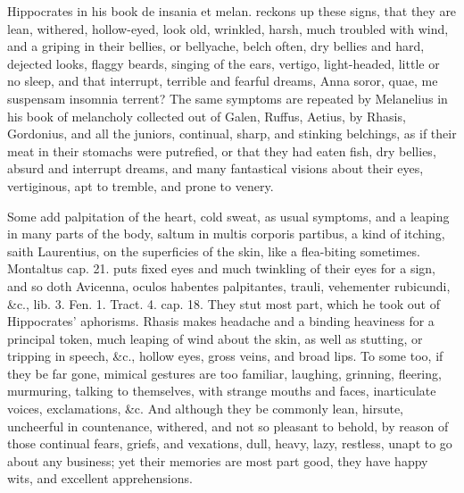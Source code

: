 {Hippocrates in his book de insania et melan. reckons up these
signs, that they are  lean, withered, hollow-eyed, look old,
wrinkled, harsh, much troubled with wind, and a griping in their
bellies, or bellyache, belch often, dry bellies and hard, dejected
looks, flaggy beards, singing of the ears, vertigo, light-headed,
little or no sleep, and that interrupt, terrible and fearful dreams,
Anna soror, quae, me suspensam insomnia terrent? The same
symptoms are repeated by Melanelius in his book of melancholy collected
out of Galen, Ruffus, Aetius, by Rhasis, Gordonius, and all the
juniors, continual, sharp, and stinking belchings, as if their
meat in their stomachs were putrefied, or that they had eaten fish, dry
bellies, absurd and interrupt dreams, and many fantastical visions
about their eyes, vertiginous, apt to tremble, and prone to venery.

Some add palpitation of the heart, cold sweat, as usual symptoms,
and a leaping in many parts of the body, saltum in multis corporis
partibus, a kind of itching, saith Laurentius, on the superficies of
the skin, like a flea-biting sometimes. Montaltus cap. 21. puts
fixed eyes and much twinkling of their eyes for a sign, and so doth
Avicenna, oculos habentes palpitantes, trauli, vehementer rubicundi,
\&c., lib. 3. Fen. 1. Tract. 4. cap. 18. They stut most part, which he
took out of Hippocrates' aphorisms. Rhasis makes headache and a
binding heaviness for a principal token, much leaping of wind about the
skin, as well as stutting, or tripping in speech, \&c., hollow eyes,
gross veins, and broad lips. To some too, if they be far gone, mimical
gestures are too familiar, laughing, grinning, fleering, murmuring,
talking to themselves, with strange mouths and faces, inarticulate
voices, exclamations, \&c. And although they be commonly lean, hirsute,
uncheerful in countenance, withered, and not so pleasant to behold, by
reason of those continual fears, griefs, and vexations, dull, heavy,
lazy, restless, unapt to go about any business; yet their memories are
most part good, they have happy wits, and excellent apprehensions.

}
